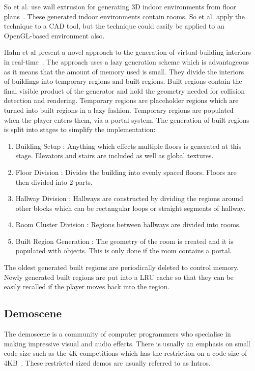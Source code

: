 So et al. use wall extrusion for generating 3D indoor environments from floor plans~\cite{so1998reconstruction}.
These generated indoor environments contain rooms.
So et al. apply the technique to a CAD tool, but the technique could easily be applied to an OpenGL-based environment also.

Hahn et al present a novel approach to the generation of virtual building interiors in real-time~\cite{hahn2006persistent}.
The approach uses a lazy generation scheme which is advantageous as it means that the amount of memory used is small. 
They divide the interiors of buildings into temporary regions and built regions.
Built regions contain the final visible product of the generator and hold the geometry needed for collision detection and rendering.
Temporary regions are placeholder regions which are turned into built regions in a lazy fashion.
Temporary regions are populated when the player enters them, via a portal system.
The generation of built regions is split into stages to simplify the implementation:

\begin{enumerate}
	\item Building Setup : Anything which effects multiple floors is generated at this stage. Elevators and stairs are included as well as global textures.
	\item Floor Division : Divides the building into evenly spaced floors. Floors are then divided into 2 parts.
	\item Hallway Division : Hallways are constructed by dividing the regions around other blocks which can be rectangular loops or straight segments of hallway. 
	\item Room Cluster Division : Regions between hallways are divided into rooms. 
	\item Built Region Generation : The geometry of the room is created and it is populated with objects. This is only done if the room contains a portal.
\end{enumerate}

The oldest generated built regions are periodically deleted to control memory. 
Newly generated built regions are put into a LRU cache so that they can be easily recalled if the player moves back into the region.

\subsection{Demoscene}
The demoscene is a community of computer programmers who specialise in making impressive visual and audio effects.
There is usually an emphasis on small code size such as the 4K competitions which has the restriction on a code size of 4KB~\cite{web:demoscene4k}.
These restricted sized demos are usually referred to as Intros.


